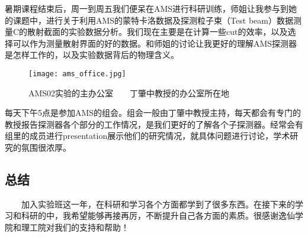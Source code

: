\documentclass{article}
\begin{document}
\begin{CJK*}{UTF8}{gbsn}
    暑期课程结束后，周一到周五我们便呆在AMS进行科研训练，师姐让我参与到她的课题中，进行关于利用AMS的蒙特卡洛数据及探测粒子束（Test beam）数据测量C的散射截面的实验数据分析。我们现在主要是在计算一些cut的效率，以及选择可以作为测量散射界面的好的数据。和师姐的讨论让我更好的理解AMS探测器是怎样工作的，以及实验数据背后的物理含义。
\begin{figure}[h!]
\centering
\texttt{[image: ams\_office.jpg]}
\caption{AMS02实验的主办公室~~~~丁肇中教授的办公室所在地}
\label{fig:ams_office}
\end{figure}
    
    每天下午5点是参加AMS的组会。组会一般由丁肇中教授主持，每天都会有专门的教授报告探测器各个部分的工作情况，是我们更好的了解各个子探测器。经常会有组里的成员进行presentation展示他们的研究情况，就具体问题进行讨论，学术研究的氛围很浓厚。
\subsection{总结}
~~~~加入实验班这一年，在科研和学习各个方面都学到了很多东西。在接下来的学习和科研的中，我希望能够再接再厉，不断提升自己各方面的素质。很感谢逸仙学院和理工院对我们的支持和帮助！
\end{CJK*}
\end{document}
